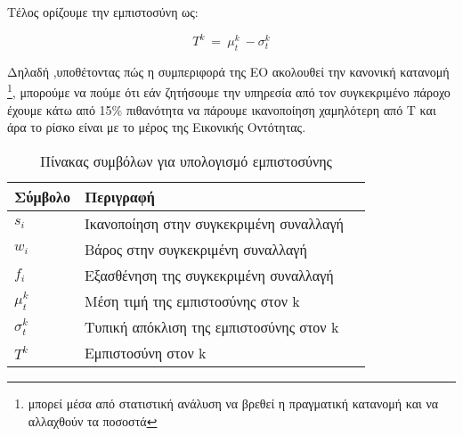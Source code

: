 Τέλος ορίζουμε την εμπιστοσύνη ως:

\begin{equation}\label{eq:trust}
 T^k \ = \ \mu_t^k \ - \sigma_t^k 
\end{equation}

Δηλαδή ,υποθέτοντας πώς η συμπεριφορά της ΕΟ ακολουθεί την κανονική κατανομή \footnote{μπορεί μέσα από στατιστική ανάλυση να βρεθεί η πραγματική κατανομή και να αλλαχθούν τα ποσοστά}, μπορούμε να πούμε ότι εάν ζητήσουμε την υπηρεσία από τον συγκεκριμένο πάροχο έχουμε κάτω από 15\% πιθανότητα να πάρουμε ικανοποίηση χαμηλότερη από Τ και άρα το ρίσκο είναι με το μέρος της Εικονικής Οντότητας.

\begin{table}[H]
    \centering
    \begin{tabular}{ | l | l | l | }
        \hline
        Σύμβολο & Περιγραφή \\ \hline \hline
        $s_i$ & Ικανοποίηση στην συγκεκριμένη συναλλαγή  \\ \hline
        $w_i$ & Βάρος στην συγκεκριμένη συναλλαγή  \\ \hline
        $f_i$ & Εξασθένηση της συγκεκριμένη συναλλαγή  \\ \hline
        $\mu_t^k$ 	& Μέση τιμή της εμπιστοσύνης στον k\\ \hline
        $\sigma_t^k$    & Τυπική απόκλιση της εμπιστοσύνης στον k \\ \hline
        $T^k$   & Εμπιστοσύνη στον k \\ \hline
            \end{tabular}
    \caption{Πίνακας συμβόλων για υπολογισμό εμπιστοσύνης}
    \label{tab:symbols_trust}
\end{table}
\newpage
